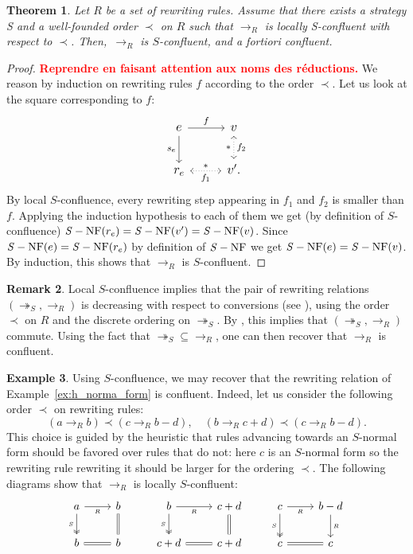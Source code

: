 \documentclass[10pt]{easychair}
\newtheorem{theorem}{Theorem}[section]
\theoremstyle{definition}
\newtheorem{remark}[theorem]{Remark}
\newtheorem{example}[theorem]{Example}
\newcommand\todo[1]{{\bf\textcolor{red}{#1}}}
\newcommand\rewR{\to_R}
\newcommand\rewS{\twoheadrightarrow_S}
\DeclareMathOperator{\SNF}{{\it S}-NF}
\begin{document}
\begin{theorem}\label{thm:confluence_criterion}
  Let $R$ be a set of rewriting rules. Assume that there exists a
  strategy S and a well-founded order $\prec$ on $R$ such that $\rewR$ is
  locally S-confluent with respect to $\prec$. Then,~$\rewR$ is
  $S$-confluent, and \emph{a fortiori} confluent. 
\end{theorem}

\begin{proof}
  \todo{Reprendre en faisant attention aux noms des réductions.}
  We reason by induction on rewriting rules $f$ according to the order
  $\prec$. Let us look at the square corresponding to $f$:
  \[\large\begin{tikzcd}
  e\ar[r, "f"]\ar[d, "s_e"'] & v\ar[d, leftrightarrow, dotted, "*"', "f_2"]\\
  r_e\ar[r, leftrightarrow, dotted, "*", "f_1"'] & v'.
  \end{tikzcd}\]
  By local $S$-confluence, every rewriting step appearing
  in $f_1$ and $f_2$ is smaller than $f$.
  Applying the induction hypothesis to each of them we get
  (by definition of $S$-confluence) $\SNF(r_e) = \SNF(v') = \SNF(v)$.
  Since $\SNF(e) = \SNF(r_e)$ by definition of $\SNF$ we get
  $\SNF(e) = \SNF(v)$. By induction, this shows that $\rewR$ is
  $S$-confluent.
\end{proof}
\medskip

\begin{remark}
  Local $S$-confluence implies that the pair of rewriting relations
  $(\rewS,\rewR)$ is decreasing with respect to conversions (see
  \cite[Definition 3]{van2008confluence}), using the order $\prec$ on $R$
  and the discrete ordering on $\rewS$. By
  \cite[Theorem 3]{van2008confluence}, this implies that $(\rewS,\rewR)$
  commute. Using the fact that $\rewS \subseteq \rewR$, one can then
  recover that $\rewR$ is confluent.
\end{remark}
\smallskip

\begin{example}\label{ex:end_to_example}
  Using $S$-confluence, we may recover that the rewriting relation of
  Example~\ref{ex:h_norma_form} is confluent. Indeed, let us consider the
  following order $\prec$ on rewriting rules:
  \[(a\rewR b)\prec(c\rewR b-d),\quad(b\rewR c+d)\prec(c\rewR b-d).\]
  This choice is guided by the heuristic that rules advancing towards an
  $S$-normal form should be favored over rules that do not: here $c$ is
  an $S$-normal form so the rewriting rule rewriting it should be larger
  for the ordering $\prec$.
  The following diagrams show that $\rewR$ is locally $S$-confluent:
  \[\begin{tikzcd}
  a\ar[r, "_R"']\ar[d, twoheadrightarrow, "_S"'] & b\ar[d, equal] & b\ar[r, "_R"']
  \ar[d, twoheadrightarrow, "_S"'] & c+d\ar[d, equal] & c\ar[r, "_R"']\ar[d,
    twoheadrightarrow, "_S"'] & b-d\ar[d, "_R"]\\
  b\ar[r, equal] & b & c+d\ar[r, equal] & c+d & c\ar[r, equal] & c
  \end{tikzcd}\]
\end{example}
\smallskip
\end{document}
